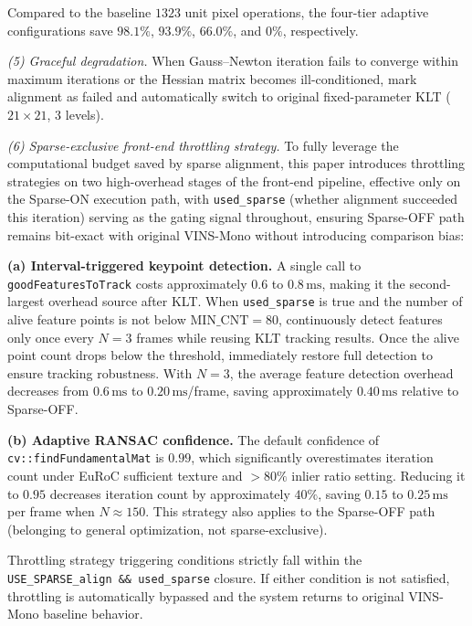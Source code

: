 \documentclass[journal,twoside,web]{ieeecolor}
\begin{document}
Compared to the baseline $1323$ unit pixel operations, the four-tier adaptive configurations save $98.1\%$, $93.9\%$, $66.0\%$, and $0\%$, respectively.

\textit{(5) Graceful degradation.} When Gauss--Newton iteration fails to converge within maximum iterations or the Hessian matrix becomes ill-conditioned, mark alignment as failed and automatically switch to original fixed-parameter KLT ($21\times21$, 3 levels).

\textit{(6) Sparse-exclusive front-end throttling strategy.} To fully leverage the computational budget saved by sparse alignment, this paper introduces throttling strategies on two high-overhead stages of the front-end pipeline, effective only on the Sparse-ON execution path, with \texttt{used\_sparse} (whether alignment succeeded this iteration) serving as the gating signal throughout, ensuring Sparse-OFF path remains bit-exact with original VINS-Mono without introducing comparison bias:

\noindent\textbf{(a) Interval-triggered keypoint detection.} A single call to \texttt{goodFeaturesToTrack} costs approximately $0.6$ to $0.8\,\mathrm{ms}$, making it the second-largest overhead source after KLT. When \texttt{used\_sparse} is true and the number of alive feature points is not below $\mathrm{MIN\_CNT}=80$, continuously detect features only once every $N=3$ frames while reusing KLT tracking results. Once the alive point count drops below the threshold, immediately restore full detection to ensure tracking robustness. With $N=3$, the average feature detection overhead decreases from $0.6\,\mathrm{ms}$ to $0.20\,\mathrm{ms}$/frame, saving approximately $0.40\,\mathrm{ms}$ relative to Sparse-OFF.

\noindent\textbf{(b) Adaptive RANSAC confidence.} The default confidence of \texttt{cv::findFundamentalMat} is $0.99$, which significantly overestimates iteration count under EuRoC sufficient texture and $>80\%$ inlier ratio setting. Reducing it to $0.95$ decreases iteration count by approximately $40\%$, saving $0.15$ to $0.25\,\mathrm{ms}$ per frame when $N\approx150$. This strategy also applies to the Sparse-OFF path (belonging to general optimization, not sparse-exclusive).

Throttling strategy triggering conditions strictly fall within the \texttt{USE\_SPARSE\_align \&\& used\_sparse} closure. If either condition is not satisfied, throttling is automatically bypassed and the system returns to original VINS-Mono baseline behavior.
\end{document}
